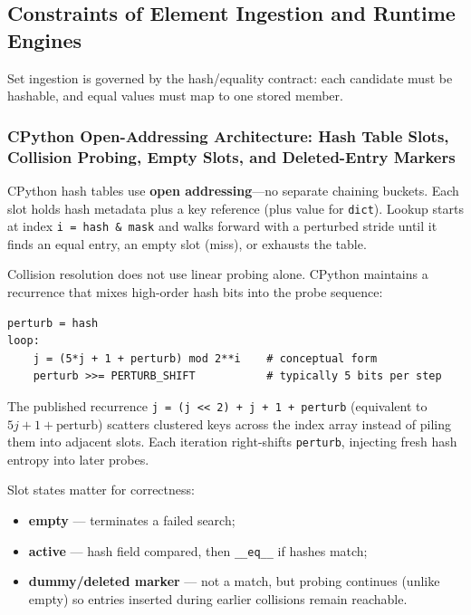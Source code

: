 \subsection{Constraints of Element Ingestion and Runtime Engines}

Set ingestion is governed by the hash/equality contract: each candidate must be hashable, and equal values must map to one stored member.

\subsubsection{CPython Open-Addressing Architecture: Hash Table Slots, Collision Probing, Empty Slots, and Deleted-Entry Markers}

CPython hash tables use \textbf{open addressing}---no separate chaining buckets. Each slot holds hash metadata plus a key reference (plus value for \texttt{dict}). Lookup starts at index \texttt{i = hash \& mask} and walks forward with a perturbed stride until it finds an equal entry, an empty slot (miss), or exhausts the table.

Collision resolution does not use linear probing alone. CPython maintains a recurrence that mixes high-order hash bits into the probe sequence:

\begin{verbatim}
perturb = hash
loop:
    j = (5*j + 1 + perturb) mod 2**i    # conceptual form
    perturb >>= PERTURB_SHIFT           # typically 5 bits per step
\end{verbatim}

The published recurrence \texttt{j = (j << 2) + j + 1 + perturb} (equivalent to $5j + 1 + \text{perturb}$) scatters clustered keys across the index array instead of piling them into adjacent slots. Each iteration right-shifts \texttt{perturb}, injecting fresh hash entropy into later probes.

Slot states matter for correctness:

\begin{itemize}
    \item \textbf{empty} --- terminates a failed search;
    \item \textbf{active} --- hash field compared, then \texttt{\_\_eq\_\_} if hashes match;
    \item \textbf{dummy/deleted marker} --- not a match, but probing continues (unlike empty) so entries inserted during earlier collisions remain reachable.
\end{itemize}


